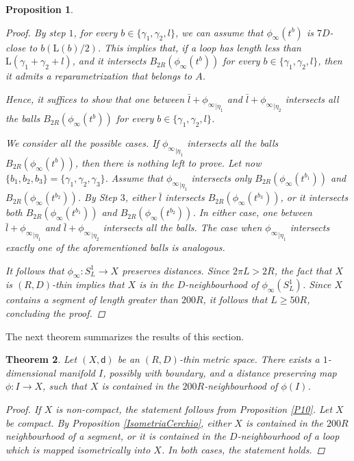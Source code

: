 \documentclass[10pt]{article}
\newtheorem{thm}{Theorem}[section]
\newtheorem{proposition}[thm]{Proposition}
\theoremstyle{definition}
\newcommand{\length}{\mathrm{L}}
\newcommand{\sd}{\mathsf{d}}
\begin{document}
\begin{proposition}
\begin{proof}
        By step $1$, for every $b \in \{\gamma_1,\gamma_2,l\}$, we can assume that $\phi_\infty(t^b)$ is $7D$-close to $b(\length(b)/2)$. This implies that, if a loop has length less than $\length(\gamma_1+\gamma_2+l)$, and it intersects $B_{2R}(\phi_\infty(t^{b}))$ for every $b \in \{\gamma_1,\gamma_2,l\}$, then it admits a reparametrization that belongs to $A$.

        Hence, it suffices to show that one between $\bar{l}+{\phi_\infty}_{|\eta_1}$ and $\bar{l}+{\phi_\infty}_{|\eta_2}$ intersects all the balls $B_{2R}(\phi_\infty(t^{b}))$ for every $b \in \{\gamma_1,\gamma_2,l\}$.

        We consider all the possible cases. If ${\phi_\infty}_{|\eta_1}$ intersects all the balls $B_{2R}(\phi_\infty(t^{b}))$, then there is nothing left to prove. Let now $\{b_1,b_2,b_3\}=\{\gamma_1,\gamma_2,\gamma_3\}$. Assume that ${\phi_\infty}_{|\eta_1}$ intersects only $B_{2R}(\phi_\infty(t^{b_1}))$ and $B_{2R}(\phi_\infty(t^{b_2}))$. By Step $3$, either $\bar{l}$ intersects $B_{2R}(\phi_\infty(t^{b_3}))$, or it intersects both $B_{2R}(\phi_\infty(t^{b_1}))$ and $B_{2R}(\phi_\infty(t^{b_2}))$. In either case, one between $\bar{l}+{\phi_\infty}_{|\eta_1}$ and $\bar{l}+{\phi_\infty}_{|\eta_2}$ intersects all the balls.  The case when ${\phi_\infty}_{|\eta_1}$ intersects exactly one of the aforementioned balls is analogous.
        
        It follows that $\phi_\infty:S^1_L \to X$ preserves distances. Since $2\pi L >2R$, the fact that $X$ is $(R,D)$-thin implies that $X$ is in the $D$-neighbourhood of $\phi_\infty(S^1_L)$. Since $X$ contains a segment of length greater than $200R$, it follows that $L \geq 50R$, concluding the proof.
     \end{proof}
\end{proposition}

The next theorem summarizes the results of this section.

\begin{thm} \label{thm(SNP)}
	Let $(X,\sd)$ be an $(R,D)$-thin metric space. There exists a $1$-dimensional manifold $I$, possibly with boundary, and a distance preserving map $\phi:I \to X$, such that $X$ is contained in the $200R$-neighbourhood of $\phi(I)$. 
	\begin{proof}
	If $X$ is non-compact, the statement follows from Proposition \ref{P10}. Let $X$ be compact. By Proposition \ref{IsometriaCerchio}, either $X$ is contained in the $200R$ neighbourhood of a segment, or it is contained in the $D$-neighbourhood of a loop which is mapped isometrically into $X$. In both cases, the statement holds. 
	\end{proof}
\end{thm}
\end{document}
